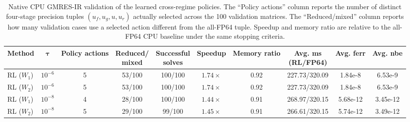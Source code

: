 \documentclass[Afour,sageh,times]{sagej}
\theoremstyle{plain}
\theoremstyle{definition}
\begin{document}
\begin{table}[ht!]
\centering\scriptsize
\setlength{\tabcolsep}{4.2pt}
\renewcommand{\arraystretch}{1.15}
\caption{Native CPU GMRES-IR validation of the learned cross-regime policies. The ``Policy actions'' column reports the number of distinct four-stage precision tuples $(u_f,u_g,u,u_r)$ actually selected across the 100 validation matrices. The ``Reduced/mixed'' column reports how many validation cases use a selected action different from the all-FP64 tuple. Speedup and memory ratio are relative to the all-FP64 CPU baseline under the same stopping criteria.}
\label{tab:cpu_native_validation}
\begin{tabular}{l c c c c c c c c c}
\toprule
\textbf{Method} & {$\boldsymbol{\tau}$} & \textbf{Policy actions}
& \shortstack{\textbf{Reduced/}\\\textbf{mixed}}
& \shortstack{\textbf{Successful}\\\textbf{solves}}
& \textbf{Speedup}
& \textbf{Memory ratio}
& \shortstack{\textbf{Avg. ms}\\\textbf{(RL/FP64)}}
& \textbf{Avg. ferr}
& \textbf{Avg. nbe}\\
\midrule
RL ($W_1$) & $10^{-6}$ & 5 & 53/100 & 100/100 & $1.74\times$ & 0.92 & 227.73/320.09 & 1.84e-8 & 6.53e-9 \\
RL ($W_2$) & $10^{-6}$ & 5 & 53/100 & 100/100 & $1.74\times$ & 0.92 & 227.73/320.09 & 1.84e-8 & 6.53e-9 \\
RL ($W_1$) & $10^{-8}$ & 4 & 28/100 & 100/100 & $1.44\times$ & 0.91 & 268.97/320.15 & 5.68e-12 & 3.45e-12 \\
RL ($W_2$) & $10^{-8}$ & 5 & 29/100 & 99/100 & $1.45\times$ & 0.91 & 266.61/320.15 & 5.74e-12 & 3.49e-12 \\
\bottomrule
\end{tabular}
\end{table}
\end{document}
